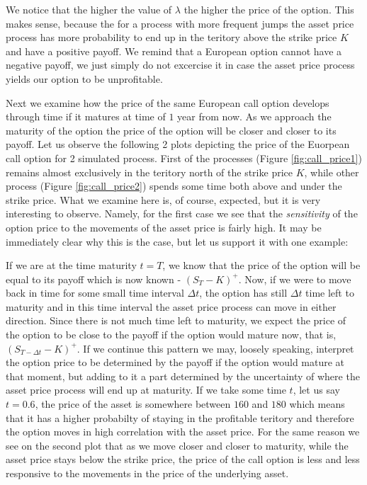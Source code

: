 \documentclass[times, utf8, diplomski]{fer}
\begin{document}
We notice that the higher the value of $\lambda$ the higher the price of the option. This makes sense, because the for a process with more frequent jumps the asset price process has more probability to end up in the teritory above the strike price $K$ and have a positive payoff. We remind that a European option cannot have a negative payoff, we just simply do not excercise it in case the asset price process yields our option to be unprofitable. 

Next we examine how the price of the same European call option develops through time if it matures at time of $1$ year from now. As we approach the maturity of the option the price of the option will be closer and closer to its payoff. Let us observe the following 2 plots depicting the price of the Euorpean call option for 2 simulated process. First of the processes (Figure \ref{fig:call_price1}) remains almost exclusively in the teritory north of the strike price $K$, while other process (Figure \ref{fig:call_price2}) spends some time both above and under the strike price. What we examine here is, of course, expected, but it is very interesting to observe. Namely, for the first case we see that the \textit{sensitivity} of the option price to the movements of the asset price is fairly high. It may be immediately clear why this is the case, but let us support it with one example:

\hfill \break
\indent If we are at the time maturity $t=T$, we know that the price of the option will be equal to its payoff which is now known - $(S_T - K)^+$. Now, if we were to move back in time for some small time interval $\Delta t$, the option has still $\Delta t$ time left to maturity and in this time interval the asset price process can move in either direction. Since there is not much time left to maturity, we expect the price of the option to be close to the payoff if the option would mature now, that is, $(S_{T-\Delta t} - K)^+$. If we continue this pattern we may, loosely speaking, interpret the option price to be determined by the payoff if the option would mature at that moment, but adding to it a part determined by the uncertainty of where the asset price process will end up at maturity.
If we take some time $t$, let us say $t=0.6$, the price of the asset is somewhere between $160$ and $180$ which means that it has a higher probabilty of staying in the profitable teritory and therefore the option moves in high correlation with the asset price. For the same reason we see on the second plot that as we move closer and closer to maturity, while the asset price stays below the strike price, the price of the call option is less and less responsive to the movements in the price of the underlying asset. 
\end{document}
